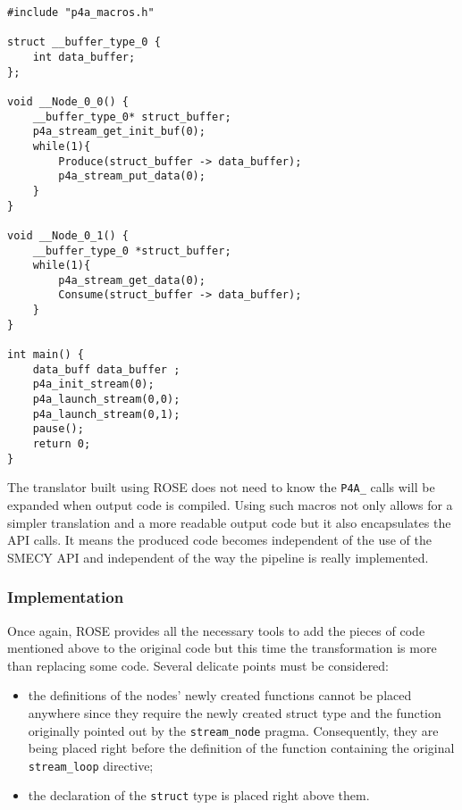 \documentclass[a4paper]{article}
\begin{document}
	\begin{lstlisting}[label=macros,caption={Streaming output code with
macro calls. The definitions of \texttt{Produce} and \texttt{Consume} functions are not shown.}]
#include "p4a_macros.h" 

struct __buffer_type_0 {
	int data_buffer;
};

void __Node_0_0() {
	__buffer_type_0* struct_buffer;
	p4a_stream_get_init_buf(0);
	while(1){
		Produce(struct_buffer -> data_buffer);
		p4a_stream_put_data(0);
	}
}

void __Node_0_1() {
	__buffer_type_0 *struct_buffer;
	while(1){
		p4a_stream_get_data(0);
		Consume(struct_buffer -> data_buffer);
	}
}

int main() {
	data_buff data_buffer ;
	p4a_init_stream(0);
	p4a_launch_stream(0,0);
	p4a_launch_stream(0,1);
	pause();
	return 0;
}
	\end{lstlisting}

	The translator built using ROSE does not need to know the \verb+P4A_+
    calls will be expanded when output code is compiled. Using such macros
    not only allows for a simpler translation and a more readable output
    code but it also encapsulates the API calls. It means the produced
    code becomes independent of the use of the SMECY API and independent
    of the way the pipeline is really implemented.

	\subsubsection{Implementation} Once again, ROSE provides all the necessary tools to add the pieces of code mentioned above to the original code but this time the transformation is more than replacing some code. Several delicate points must be considered:
	\begin{itemize}
		\item the definitions of the nodes' newly created functions cannot be placed anywhere since they require the newly created struct type and the function originally pointed out by the \verb+stream_node+ pragma. Consequently, they are being placed right before the definition of the function containing the original \verb+stream_loop+ directive;
        \item the declaration of the \texttt{struct} type is placed right above them.
	\end{itemize}
	
	
\end{document}
